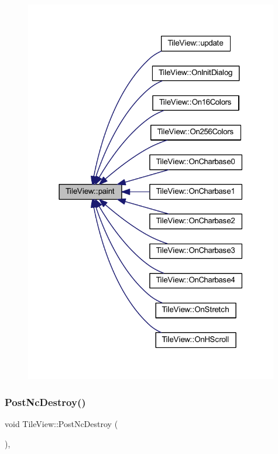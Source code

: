 \begin{figure}[H]
\begin{center}
\leavevmode
\includegraphics[width=314pt]{class_tile_view_a4341071a0cab0d5a8b6dfa7318230636_icgraph}
\end{center}
\end{figure}
\mbox{\label{class_tile_view_a83fee9256658f418f7562c0ff098eb22}} 
\subsubsection{\texorpdfstring{Post\+Nc\+Destroy()}{PostNcDestroy()}}
{\footnotesize\ttfamily void Tile\+View\+::\+Post\+Nc\+Destroy (\begin{DoxyParamCaption}{ }\end{DoxyParamCaption})\hspace{0.3cm}{\ttfamily [protected]}, {\ttfamily [virtual]}}



